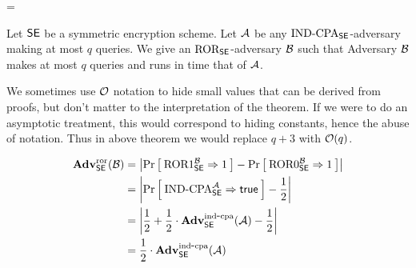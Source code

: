 \bnm
\AdvCTXT{\SE}{\advA} = \Prob{\CTXT_\SE^\advA\Rightarrow\true}\\
\enm


\begin{theorem}
Let ${\mathsf{SE}}$ be a symmetric encryption scheme. Let ${\mathcal A}$ be any
$\textnormal{IND-CPA}_{\mathsf{SE}}$-adversary making at most $q$ queries. 
We give an $\textnormal{ROR}_{\mathsf{SE}}$-adversary ${\mathcal B}$ such that
\bnm
  \AdvINDCPA{\SE}{\advA} \cdotsm\AdvROR{\SE}{\advB}
\enm
Adversary ${\mathcal B}$ makes at most $q$ 
queries and runs in time that of ${\mathcal A}$.
\label{theorem:ror-cpa}
\end{theorem}

We sometimes use ${\cal O}$ notation to hide small values that can be derived from
proofs, but don't matter to the interpretation of the theorem. If we were to do
an asymptotic treatment, this would correspond to hiding constants, hence the
abuse of notation.  Thus in above theorem we would replace $q+3$ with
${\cal O}(q)$. 



\begin{align*}
\mathbf{Adv}^{\mathrm{ror}}_{{\mathsf{SE}}}({\mathcal B}) 
    &= \left|\Pr\left[\: \textnormal{ROR}1_{\mathsf{SE}}^{\mathcal B}\Rightarrow 1 \:\right] -
                                \Pr\left[\: \textnormal{ROR}0_{\mathsf{SE}}^{\mathcal B}\Rightarrow 1 \:\right]\right|\\
    &= \left|\Pr\left[\: \textnormal{IND-CPA}_{\mathsf{SE}}^{\mathcal A}\Rightarrow\mathsf{true} \:\right] - \frac{1}{2}\right|\\
    &= \left|\frac{1}{2} +
    \frac{1}{2}\cdot\mathbf{Adv}^{\mathrm{ind\mbox{-} cpa}}_{{\mathsf{SE}}}({\mathcal A}) - \frac{1}{2}\right|\\
    &= \frac{1}{2}\cdot\mathbf{Adv}^{\mathrm{ind\mbox{-} cpa}}_{{\mathsf{SE}}}({\mathcal A})
\end{align*}






